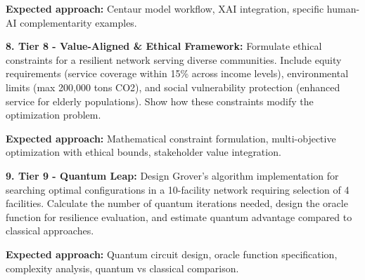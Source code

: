 \documentclass{article}
\begin{document}
\textbf{Expected approach:} Centaur model workflow, XAI integration, specific human-AI complementarity examples.

\textbf{8. Tier 8 - Value-Aligned \& Ethical Framework:}
Formulate ethical constraints for a resilient network serving diverse communities. Include equity requirements (service coverage within 15\% across income levels), environmental limits (max 200,000 tons CO2), and social vulnerability protection (enhanced service for elderly populations). Show how these constraints modify the optimization problem.

\textbf{Expected approach:} Mathematical constraint formulation, multi-objective optimization with ethical bounds, stakeholder value integration.

\textbf{9. Tier 9 - Quantum Leap:}
Design Grover's algorithm implementation for searching optimal configurations in a 10-facility network requiring selection of 4 facilities. Calculate the number of quantum iterations needed, design the oracle function for resilience evaluation, and estimate quantum advantage compared to classical approaches.

\textbf{Expected approach:} Quantum circuit design, oracle function specification, complexity analysis, quantum vs classical comparison.
\end{document}
